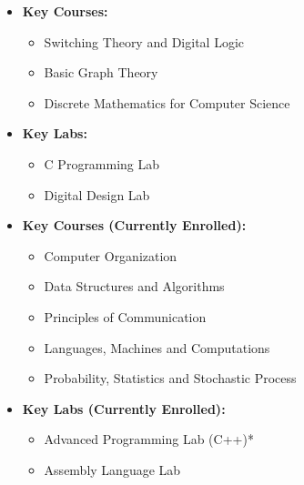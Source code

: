 \documentclass[letterpaper,11pt]{resume}
\begin{document}
\begin{multicols}{2}
{{ \begin{itemize}
    \item{\bf Key Courses:}
      {\begin{itemize}
        \item  {Switching Theory and Digital Logic}
	\item {Basic Graph Theory}
	\item {Discrete Mathematics for Computer Science}
	\end{itemize}
      }	
      \end{itemize}
    }
 \begin{itemize}
 \item {\bf Key Labs:}
 {
  \begin{itemize}
    \item {C Programming Lab}
    \item {Digital Design Lab}
  \end{itemize}
 }
\end{itemize}
\vspace{5em}
{\begin{itemize}
       \item{\bf Key Courses (Currently Enrolled):}
      {
      \begin{itemize}
       \item {Computer Organization}
       \item {Data Structures and Algorithms}
       \item Principles of Communication 
       \item Languages, Machines and Computations
       \item Probability, Statistics and Stochastic Process
        \end{itemize}
      }
      \end{itemize}
    }}
    {
}{
\begin{itemize}
 \item {\bf Key Labs (Currently Enrolled):}
 {
  \begin{itemize}
    \item Advanced Programming Lab (C++)*
    \item Assembly Language Lab
     \end{itemize}
 }
\end{itemize}
}
\end{multicols}
\end{document}
